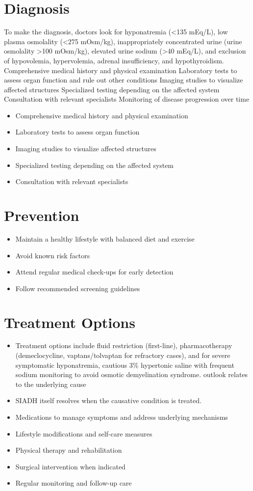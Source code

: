 \section{Diagnosis}
To make the diagnosis, doctors look for hyponatremia (<135 mEq/L), low plasma osmolality (<275 mOsm/kg), inappropriately concentrated urine (urine osmolality >100 mOsm/kg), elevated urine sodium (>40 mEq/L), and exclusion of hypovolemia, hypervolemia, adrenal insufficiency, and hypothyroidism. Comprehensive medical history and physical examination Laboratory tests to assess organ function and rule out other conditions Imaging studies to visualize affected structures Specialized testing depending on the affected system Consultation with relevant specialists Monitoring of disease progression over time

\begin{itemize}[noitemsep]
  \item Comprehensive medical history and physical examination
  \item Laboratory tests to assess organ function
  \item Imaging studies to visualize affected structures
  \item Specialized testing depending on the affected system
  \item Consultation with relevant specialists
\end{itemize}
\section{Prevention}
\begin{itemize}[noitemsep]
  \item Maintain a healthy lifestyle with balanced diet and exercise
  \item Avoid known risk factors
  \item Attend regular medical check-ups for early detection
  \item Follow recommended screening guidelines
\end{itemize}
\section{Treatment Options}
\begin{itemize}[noitemsep]
  \item Treatment options include fluid restriction (first-line), pharmacotherapy (demeclocycline, vaptans/tolvaptan for refractory cases), and for severe symptomatic hyponatremia, cautious 3\% hypertonic saline with frequent sodium monitoring to avoid osmotic demyelination syndrome. outlook relates to the underlying cause
  \item SIADH itself resolves when the causative condition is treated.
  \item Medications to manage symptoms and address underlying mechanisms
  \item Lifestyle modifications and self-care measures
  \item Physical therapy and rehabilitation
  \item Surgical intervention when indicated
  \item Regular monitoring and follow-up care
\end{itemize}
